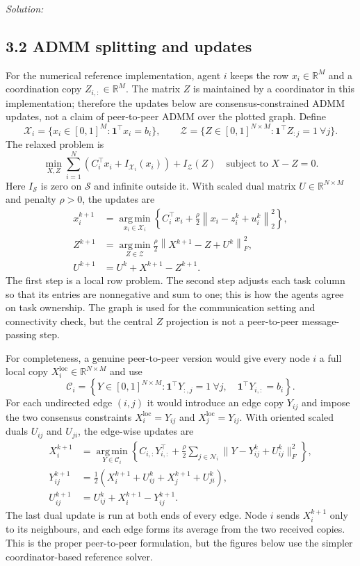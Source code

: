 \documentclass[a4paper,11pt]{article}
\newenvironment{solution}{\textit{Solution:}}{}
\newcommand{\ones}{\mathbf{1}}
\newcommand{\R}{\mathbb{R}}
\newcommand{\argmin}{\operatorname*{arg\,min}}
\newcommand{\norm}[1]{\left\|#1\right\|}
\begin{document}
\begin{solution}
\subsection*{3.2 ADMM splitting and updates}
For the numerical reference implementation, agent $i$ keeps the row $x_i\in\R^M$ and a
coordination copy $Z_{i,:}\in\R^M$. The matrix $Z$ is maintained by a coordinator in this
implementation; therefore the updates below are consensus-constrained ADMM updates, not a claim of
peer-to-peer ADMM over the plotted graph. Define
\[
\mathcal X_i=\{x_i\in[0,1]^M:\ones^\top x_i=b_i\},\qquad
\mathcal Z=\{Z\in[0,1]^{N\times M}:\ones^\top Z_{:j}=1\ \forall j\}.
\]
The relaxed problem is
\[
\min_{X,Z}\sum_{i=1}^N\left(C_i^\top x_i+I_{\mathcal X_i}(x_i)\right)+I_{\mathcal Z}(Z)
\quad\text{subject to }X-Z=0.
\]
Here $I_{\mathcal S}$ is zero on $\mathcal S$ and infinite outside it. With scaled dual matrix
$U\in\R^{N\times M}$ and penalty $\rho>0$, the updates are
\[
\begin{aligned}
x_i^{k+1}&=\argmin_{x_i\in\mathcal X_i}\left\{C_i^\top x_i+\frac\rho2\norm{x_i-z_i^k+u_i^k}_2^2\right\},\\
Z^{k+1}&=\argmin_{Z\in\mathcal Z}\frac\rho2\norm{X^{k+1}-Z+U^k}_F^2,\\
U^{k+1}&=U^k+X^{k+1}-Z^{k+1}.
\end{aligned}
\]
The first step is a local row problem. The second step adjusts each task column so that its entries
are nonnegative and sum to one; this is how the agents agree on task ownership. The graph is used
for the communication setting and connectivity check, but the central $Z$ projection is not a
peer-to-peer message-passing step.

For completeness, a genuine peer-to-peer version would give every node $i$ a full local copy
$X_i^{\mathrm{loc}}\in\R^{N\times M}$ and use
\[
\mathcal C_i=\left\{Y\in[0,1]^{N\times M}:\ones^\top Y_{:,j}=1\ \forall j,\quad
\ones^\top Y_{i,:}=b_i\right\}.
\]
For each undirected edge $(i,j)$ it would introduce an edge copy $Y_{ij}$ and impose the two
consensus constraints $X_i^{\mathrm{loc}}=Y_{ij}$ and $X_j^{\mathrm{loc}}=Y_{ij}$. With oriented
scaled duals $U_{ij}$ and $U_{ji}$, the edge-wise updates are
\[
\begin{aligned}
X_i^{k+1}&=\argmin_{Y\in\mathcal C_i}\left\{C_{i,:}Y_{i,:}^{\top}
 +\frac{\rho}{2}\sum_{j\in\mathcal N_i}\|Y-Y_{ij}^k+U_{ij}^k\|_F^2\right\},\\
Y_{ij}^{k+1}&=\tfrac12\left(X_i^{k+1}+U_{ij}^k+X_j^{k+1}+U_{ji}^k\right),\\
U_{ij}^{k+1}&=U_{ij}^k+X_i^{k+1}-Y_{ij}^{k+1}.
\end{aligned}
\]
The last dual update is run at both ends of every edge. Node $i$ sends $X_i^{k+1}$ only to its
neighbours, and each edge forms its average from the two received copies. This is the proper
peer-to-peer formulation, but the figures below use the simpler coordinator-based reference solver.


\end{solution}
\end{document}
